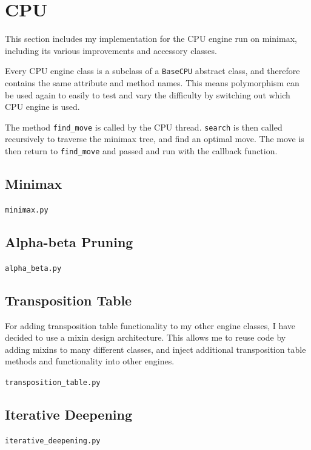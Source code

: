 \documentclass[../main/main.tex]{subfiles}
\begin{document}
\section{CPU}
This section includes my implementation for the CPU engine run on minimax, including its various improvements and accessory classes.

Every CPU engine class is a subclass of a \lstinline{BaseCPU} abstract class, and therefore contains the same attribute and method names. This means polymorphism can be used again to easily to test and vary the difficulty by switching out which CPU engine is used.

The method \lstinline{find_move} is called by the CPU thread. \lstinline{search} is then called recursively to traverse the minimax tree, and find an optimal move. The move is then return to \lstinline{find_move} and passed and run with the callback function.

\subsection{Minimax}
\label{sec:minimax}
\noindent\verb|minimax.py|


\subsection{Alpha-beta Pruning}
\label{sec:alpha-beta}
\noindent\verb|alpha_beta.py|


\subsection{Transposition Table}
\label{sec:transposition-table}
For adding transposition table functionality to my other engine classes, I have decided to use a mixin design architecture. This allows me to reuse code by adding mixins to many different classes, and inject additional transposition table methods and functionality into other engines.

\noindent\verb|transposition_table.py|


\subsection{Iterative Deepening}
\noindent\verb|iterative_deepening.py|

\end{document}
